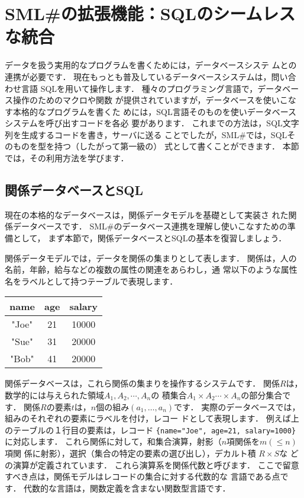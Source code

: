 \documentclass{jbook}
\newcommand{\smlsharp}{SML\#}
\begin{document}
\chapter{\smlsharp{}の拡張機能：SQLのシームレスな統合}
\label{chap:tutorialDatabase}

	データを扱う実用的なプログラムを書くためには，データベースシステ
ムとの連携が必要です．
	現在もっとも普及しているデータベースシステムは，問い合わせ言語
SQLを用いて操作します．
	種々のプログラミング言語で，データベース操作のためのマクロや関数
が提供されていますが，データベースを使いこなす本格的なプログラムを書くた
めには，SQL言語そのものを使いデータベースシステムを呼び出すコードを各必
要があります． 
	これまでの方法は，SQL文字列を生成するコードを書き，サーバに送る
ことでしたが，\smlsharp{}では，SQLそのものを型を持つ（したがって第一級の）
式として書くことができます．
	本節では，その利用方法を学びます．
	
\section{関係データベースとSQL}
\label{sec:tutorialRelationalModel}

	現在の本格的なデータベースは，関係データモデルを基礎として実装さ
れた関係データベースです．
	\smlsharp{}のデータベース連携を理解し使いこなすための準備として，
まず本節で，関係データベースとSQLの基本を復習しましょう．

	関係データモデルでは，データを関係の集まりとして表します．
	関係は，人の名前，年齢，給与などの複数の属性の関連をあらわし，通
常以下のような属性名をラベルとして持つテーブルで表現します．

\begin{center}
\begin{tabular}{|c|c|c|}
\hline
name & age & salary
\\\hline
"Joe" & 21 & 10000
\\\hline
"Sue" & 31 & 20000
\\\hline
"Bob" & 41 & 20000
\\\hline
\end{tabular}
\end{center}

	関係データベースは，これら関係の集まりを操作するシステムです．
	関係$R$は，数学的には与えられた領域$A_1,A_2,\cdots,A_n$の
積集合$A_1\times A_2 \cdots \times A_n$の部分集合です．
	関係$R$の要素$t$は，$n$個の組み$(a_1,\ldots,a_n)$です．
	実際のデータベースでは，組みのそれぞれの要素にラベルを付け，レコー
ドとして表現します．
	例えば上のテーブルの１行目の要素は，レコード
{\tt \{name="Joe", age=21, salary=1000\}}に対応します．
	これら関係に対して，和集合演算，射影（$n$項関係を$m (\le n)$項関
係に射影），選択（集合の特定の要素の選び出し），デカルト積 $R\times S$な
どの演算が定義されています．
	これら演算系を関係代数と呼びます．
	ここで留意すべき点は，関係モデルはレコードの集合に対する代数的な
言語である点です．
	代数的な言語は，関数定義を含まない関数型言語です．
\end{document}
